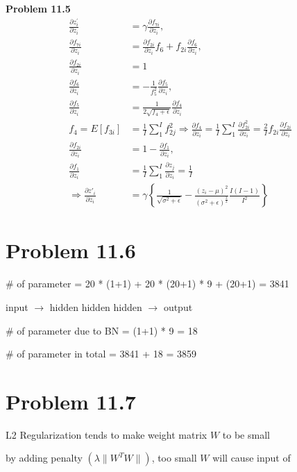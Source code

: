 \documentclass{article}
\begin{document}
\textbf{Problem 11.5}
\begin{align*}
\frac{\partial z^{'}_i}{\partial z_i} &= \gamma \frac{\partial f_{7i}}{\partial z_i}, \\
\frac{\partial f_{7i}}{\partial z_i} &= \frac{\partial f_{2i}}{\partial z_i} f_6 + f_{2i} \frac{\partial f_6}{\partial z_i}, \\
\frac{\partial f_{2i}}{\partial z_i} &= 1 \\
\frac{\partial f_6}{\partial z_i} &= -\frac{1}{f_5^2} \frac{\partial f_5}{\partial z_i}, \\
\frac{\partial f_5}{\partial z_i} &= \frac{1}{2\sqrt{f_4+\epsilon}} \frac{\partial f_4}{\partial z_i} \\
f_4 = E[f_{3i}] &= \frac{1}{I}\sum_1^I f^2_{2j} \Rightarrow \frac{\partial f_4}{\partial z_i} = \frac{1}{I}\sum_1^I \frac{\partial f_{2i}^2}{\partial z_i} = \frac{2}{I}f_{2i}\frac{\partial f_{2i}}{\partial z_i} \\
\frac{\partial f_{2i}}{\partial z_i} &= 1 - \frac{\partial f_1}{\partial z_i}, \\
\frac{\partial f_1}{\partial z_i} &= \frac{1}{I}\sum_1^I \frac{\partial z_j}{\partial z_i} = \frac{1}{I} \\
\Rightarrow \frac{\partial z'_i}{\partial z_i} &= \gamma \left\{\frac{1}{\sqrt{\sigma^2+\epsilon}} - \frac{(z_i-\mu)^2}{(\sigma^2+\epsilon)^{\frac{3}{2}}}\frac{I(I-1)}{I^2}\right\}
\end{align*}


\section*{Problem 11.6}
\# of parameter = 20 * (1+1) + 20 * (20+1) * 9 + (20+1) = 3841 

\noindent \hspace*{2cm} input $\rightarrow$ hidden \hspace{1cm} hidden \hspace{1cm} hidden $\rightarrow$ output 

\noindent \# of parameter due to BN = (1+1) * 9 = 18 

\noindent \# of parameter in total = 3841 + 18 = 3859

\section*{Problem 11.7}
L2 Regularization tends to make weight matrix $W$ to be small

\noindent by adding penalty $(\lambda \|W^TW\|)$, too small $W$ will cause input of
\end{document}
